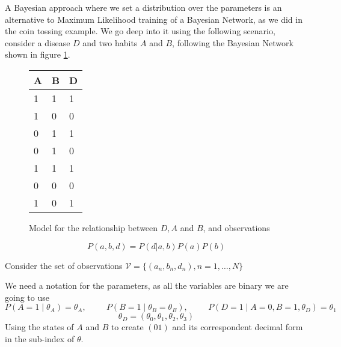 A Bayesian approach where we set a distribution over the parameters is an
alternative to Maximum Likelihood training of a Bayesian Network, as we did in
the coin tossing example. We go deep into it using the following scenario, consider a disease
\(D\) and two habits \(A\) and \(B\), following the Bayesian Network shown in
figure \ref{fig:bayesian_example}.

\begin{figure}[!ht]
  \centering
  \qquad
  \begin{tabular}{|l|l|l|}
    \hline
    A & B & D \\ \hline
    1 & 1 & 1 \\ \hline
    1 & 0 & 0 \\ \hline
    0 & 1 & 1 \\ \hline
    0 & 1 & 0 \\ \hline
    1 & 1 & 1 \\ \hline
    0 & 0 & 0 \\ \hline
    1 & 0 & 1 \\ \hline
  \end{tabular}
  \caption{Model for the relationship between \(D,A\) and \(B\), and
    observations}
 \label{fig:bayesian_example}
\end{figure}



\[
P(a,b,d) = P(d|a,b)P(a)P(b)
\]

Consider the set of observations
\(\mathcal{V} = \{(a_{n}, b_{n}, d_{n}), n = 1,\dots , N\}\)

We need a notation for the parameters, as all the variables are binary we are
going to use
\[
  P(A = 1 \mid \theta_{A}) = \theta_{A}, \hspace{1cm} P(B = 1 \mid \theta_{B} = \theta_{B}), \hspace{1cm} P(D = 1 \mid A = 0, B = 1, \theta_{D}) = \theta_{1}
\]
\[\theta_{D} = (\theta_{0}, \theta_{1}, \theta_{2}, \theta_{3})\]
Using the states of \(A\) and \(B\) to create \((01)\) and its correspondent
decimal form in the sub-index of \(\theta\).

